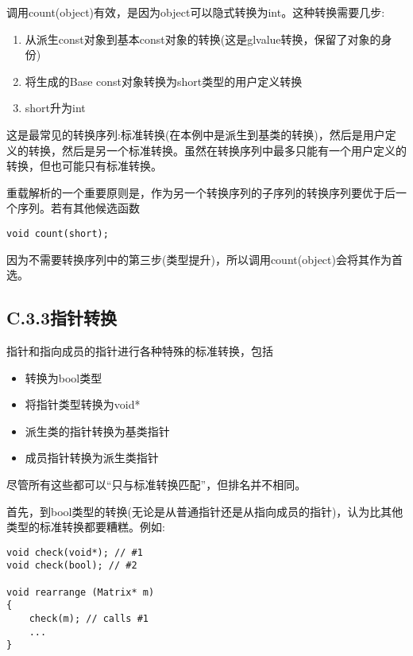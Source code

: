 调用count(object)有效，是因为object可以隐式转换为int。这种转换需要几步:

\begin{enumerate}
\item 
从派生const对象到基本const对象的转换(这是glvalue转换，保留了对象的身份)

\item 
将生成的Base const对象转换为short类型的用户定义转换

\item 
short升为int
\end{enumerate}

这是最常见的转换序列:标准转换(在本例中是派生到基类的转换)，然后是用户定义的转换，然后是另一个标准转换。虽然在转换序列中最多只能有一个用户定义的转换，但也可能只有标准转换。

重载解析的一个重要原则是，作为另一个转换序列的子序列的转换序列要优于后一个序列。若有其他候选函数

\begin{lstlisting}[style=styleCXX]
void count(short);
\end{lstlisting}

因为不需要转换序列中的第三步(类型提升)，所以调用count(object)会将其作为首选。

\subsection{C.3.3\hspace{0.2cm}指针转换}

指针和指向成员的指针进行各种特殊的标准转换，包括

\begin{itemize}
\item 
转换为bool类型

\item 
将指针类型转换为void*

\item 
派生类的指针转换为基类指针

\item 
成员指针转换为派生类指针
\end{itemize}

尽管所有这些都可以“只与标准转换匹配”，但排名并不相同。

首先，到bool类型的转换(无论是从普通指针还是从指向成员的指针)，认为比其他类型的标准转换都要糟糕。例如:

\begin{lstlisting}[style=styleCXX]
void check(void*); // #1
void check(bool); // #2

void rearrange (Matrix* m)
{
	check(m); // calls #1
	...
}
\end{lstlisting}

